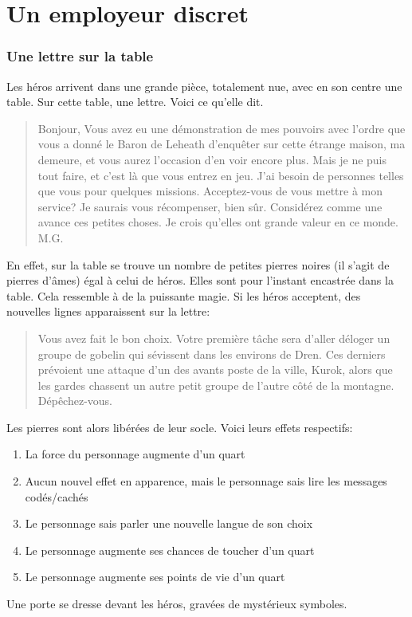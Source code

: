 \documentclass[a4paper, 11pt]{article}
\begin{document}
\part{Un employeur discret}
\section{Une lettre sur la table}
Les héros arrivent dans une grande pièce, totalement nue, avec en son centre une table. Sur cette table, une lettre. Voici ce qu'elle dit.
\begin{quotation}
Bonjour,
\newline
Vous avez eu une démonstration de mes pouvoirs avec l'ordre que vous a donné le Baron de Leheath d’enquêter sur cette étrange maison, ma demeure, et vous aurez l'occasion d'en voir encore plus. Mais je ne puis tout faire, et c'est là que vous entrez en jeu. J'ai besoin de personnes telles que vous pour quelques missions. Acceptez-vous de vous mettre à mon service?
\newline
Je saurais vous récompenser, bien sûr. Considérez comme une avance ces petites choses. Je crois qu'elles ont grande valeur en ce monde.
\newline
M.G.
\end{quotation}
En effet, sur la table se trouve un nombre de petites pierres noires (il s'agit de pierres d'âmes) égal à celui de héros. Elles sont pour l'instant encastrée dans la table. Cela ressemble à de la puissante magie. Si les héros acceptent, des nouvelles lignes apparaissent sur la lettre:
\begin{quotation}
Vous  avez fait le bon choix. Votre première tâche sera d'aller déloger un groupe de gobelin qui sévissent dans les environs de Dren. Ces derniers prévoient une attaque d'un des avants poste de la ville, Kurok, alors que les gardes chassent un autre petit groupe de l'autre côté de la montagne. Dépêchez-vous.
\end{quotation}
Les pierres sont alors libérées de leur socle. Voici leurs effets respectifs:
\begin{enumerate}
\item La force du personnage augmente d'un quart
\item Aucun nouvel effet en apparence, mais le personnage sais lire les messages codés/cachés
\item Le personnage sais parler une nouvelle langue de son choix
\item Le personnage augmente ses chances de toucher d'un quart
\item Le personnage augmente ses points de vie d'un quart
\end{enumerate}
Une porte se dresse devant les héros, gravées de mystérieux symboles.
\end{document}
